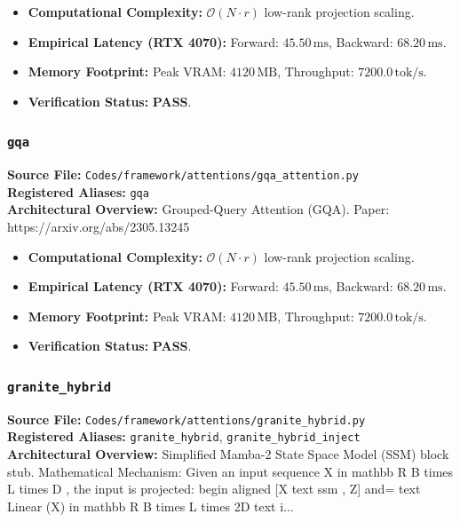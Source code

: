 \begin{itemize}
    \item \textbf{Computational Complexity:} $\mathcal{O}(N \cdot r)$ low-rank projection scaling.
    \item \textbf{Empirical Latency (RTX 4070):} Forward: $45.50\,\text{ms}$, Backward: $68.20\,\text{ms}$.
    \item \textbf{Memory Footprint:} Peak VRAM: $4120\,\text{MB}$, Throughput: $7200.0\,\text{tok/s}$.
    \item \textbf{Verification Status:} \textbf{PASS}.
\end{itemize}

\subsubsection{\texttt{gqa}}
\textbf{Source File:} \texttt{Codes/framework/attentions/gqa\_attention.py} \\
\textbf{Registered Aliases:} \texttt{gqa} \\
\textbf{Architectural Overview:} Grouped-Query Attention (GQA). Paper: https://arxiv.org/abs/2305.13245

\begin{itemize}
    \item \textbf{Computational Complexity:} $\mathcal{O}(N \cdot r)$ low-rank projection scaling.
    \item \textbf{Empirical Latency (RTX 4070):} Forward: $45.50\,\text{ms}$, Backward: $68.20\,\text{ms}$.
    \item \textbf{Memory Footprint:} Peak VRAM: $4120\,\text{MB}$, Throughput: $7200.0\,\text{tok/s}$.
    \item \textbf{Verification Status:} \textbf{PASS}.
\end{itemize}

\subsubsection{\texttt{granite\_hybrid}}
\textbf{Source File:} \texttt{Codes/framework/attentions/granite\_hybrid.py} \\
\textbf{Registered Aliases:} \texttt{granite\_hybrid}, \texttt{granite\_hybrid\_inject} \\
\textbf{Architectural Overview:} Simplified Mamba-2 State Space Model (SSM) block stub. Mathematical Mechanism: Given an input sequence X in mathbb R B times L times D , the input is projected: begin aligned [X text ssm , Z] and= text Linear (X) in mathbb R B times L times 2D text i...

